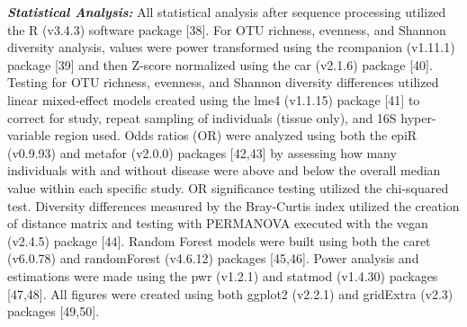 \documentclass[12pt,]{article}
\begin{document}
\textbf{\emph{Statistical Analysis:}} All statistical analysis after
sequence processing utilized the R (v3.4.3) software package {[}38{]}.
For OTU richness, evenness, and Shannon diversity analysis, values were
power transformed using the rcompanion (v1.11.1) package {[}39{]} and
then Z-score normalized using the car (v2.1.6) package {[}40{]}. Testing
for OTU richness, evenness, and Shannon diversity differences utilized
linear mixed-effect models created using the lme4 (v1.1.15) package
{[}41{]} to correct for study, repeat sampling of individuals (tissue
only), and 16S hyper-variable region used. Odds ratios (OR) were
analyzed using both the epiR (v0.9.93) and metafor (v2.0.0) packages
{[}42,43{]} by assessing how many individuals with and without disease
were above and below the overall median value within each specific
study. OR significance testing utilized the chi-squared test. Diversity
differences measured by the Bray-Curtis index utilized the creation of
distance matrix and testing with PERMANOVA executed with the vegan
(v2.4.5) package {[}44{]}. Random Forest models were built using both
the caret (v6.0.78) and randomForest (v4.6.12) packages {[}45,46{]}.
Power analysis and estimations were made using the pwr (v1.2.1) and
statmod (v1.4.30) packages {[}47,48{]}. All figures were created using
both ggplot2 (v2.2.1) and gridExtra (v2.3) packages {[}49,50{]}.
\end{document}
